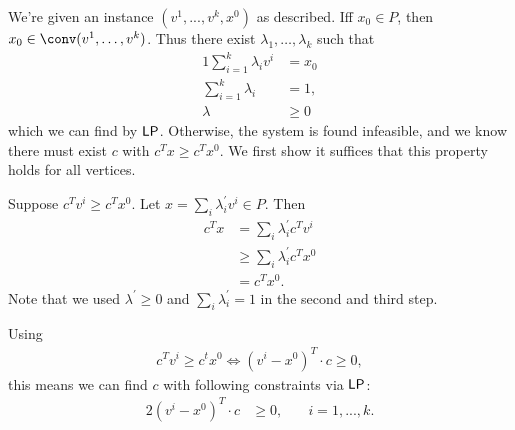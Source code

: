 \begin{aufgabe}
    We're given an instance $(v^1,...,v^k,x^0)$ as described. Iff $x_0 \in P$,
    then $x_0 \in \conv(v^1,\dots,v^k)$. Thus there exist $\lambda_1,\dots,\lambda_k$ such that
    \begin{alignat*}{1}
        \sum_{i=1}^k\lambda_i v^i & = x_0  \\
        \sum_{i=1}^k\lambda_i     & =1,    \\
        \lambda                   & \geq 0
    \end{alignat*}
    which we can find by $\mathsf{LP}$. Otherwise, the system is found infeasible, and we know there must
    exist $c$ with $c^Tx \geq c^Tx^0$. We first show it suffices that this property holds for all vertices.

    Suppose $c^Tv^i \geq c^Tx^0$. Let $x = \sum_i \lambda^\prime_i v^i \in P$. Then
    \begin{align*}
        c^Tx & = \sum_i \lambda^\prime_i c^T v^i   \\
             & \geq \sum_i \lambda^\prime_i c^Tx^0 \\
             & = c^Tx^0.
    \end{align*}
    Note that we used $\lambda^\prime \geq 0$ and $\sum_i \lambda^\prime_i =1$ in the second and third step.

    Using
    \begin{align*}
        c^Tv^i \geq c^tx^0 \Leftrightarrow (v^i - x^0)^T \cdot c \geq 0,
    \end{align*}
    this means we can find $c$ with following constraints via $\mathsf{LP}$:
    \begin{alignat*}{2}
        (v^i - x^0)^T \cdot c & \geq 0, & \quad i = 1,...,k.
    \end{alignat*}
\end{aufgabe}
\begin{aufgabe}

\end{aufgabe}